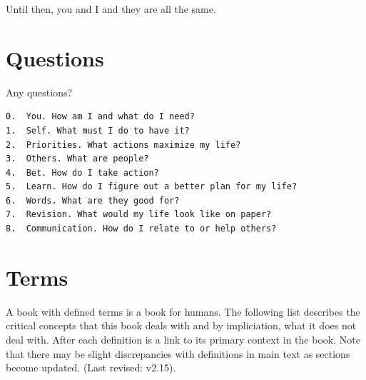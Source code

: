 \documentclass[
]{book}
\begin{document}
Until then, you and I and they are all the same.

\section{Questions}\label{questions}

Any questions?

\begin{verbatim}
0.  You. How am I and what do I need?
1.  Self. What must I do to have it?
2.  Priorities. What actions maximize my life?
3.  Others. What are people?
4.  Bet. How do I take action?
5.  Learn. How do I figure out a better plan for my life?
6.  Words. What are they good for?
7.  Revision. What would my life look like on paper?
8.  Communication. How do I relate to or help others?  
\end{verbatim}

\section{Terms}\label{terms}

A book with defined terms is a book for humans.
The following list describes the critical concepts that this book deals with and by impliciation, what it does not deal with.
After each definition is a link to its primary context in the book.
Note that there may be slight discrepancies with definitions in main text as sections become updated. (Last revised: v2.15).
\end{document}
